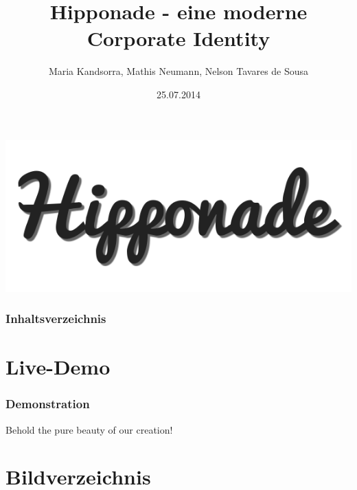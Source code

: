\documentclass{beamer}
\begin{document}
\title{Hipponade - eine moderne Corporate Identity}  
\author{Maria Kandsorra, Mathis Neumann, Nelson Tavares de Sousa}
\date{25.07.2014} 

\begin{frame}
	\begin{center}
		\includegraphics[scale=0.5]{bilder/logo.png}
	\end{center}
	\titlepage
\end{frame} 

\begin{frame}
	\frametitle{Inhaltsverzeichnis}
	\tableofcontents
\end{frame} 









\section{Live-Demo} 
\begin{frame}
	\frametitle{Demonstration} 
	Behold the pure beauty of our creation!
\end{frame}

\section{Bildverzeichnis}
\begin{frame}
	\listoffigures
\end{frame}
\end{document}
